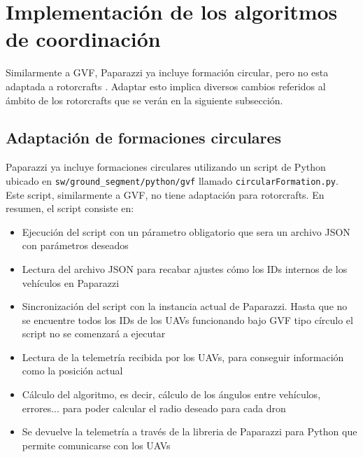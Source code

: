 \section{Implementación de los algoritmos de coordinación}

Similarmente a GVF, Paparazzi ya incluye formación circular, 
pero no esta adaptada a rotorcrafts \cite{paparazzi-circular-formation}.
Adaptar esto implica diversos cambios referidos al ámbito de los rotorcrafts 
que se verán en la siguiente subsección.


\subsection{Adaptación de formaciones circulares}

Paparazzi ya incluye formaciones circulares utilizando un script de Python ubicado en
\texttt{sw/ground\_segment/python/gvf} llamado \texttt{circularFormation.py}.
Este script, similarmente a GVF, no tiene adaptación para rotorcrafts. 
En resumen, el script consiste en:

\begin{itemize}
    \item Ejecución del script con un párametro obligatorio que sera un archivo JSON con parámetros deseados
    \item Lectura del archivo JSON para recabar ajustes cómo los IDs internos de los vehículos en Paparazzi
    \item Sincronización del script con la instancia actual de Paparazzi. Hasta que no se encuentre todos los IDs de los UAVs funcionando bajo GVF tipo círculo el script no se comenzará a ejecutar
    \item Lectura de la telemetría recibida por los UAVs, para conseguir información como la posición actual
    \item Cálculo del algoritmo, es decir, cálculo de los ángulos entre vehículos, errores... para poder calcular el radio deseado para cada dron
    \item Se devuelve la telemetría a través de la libreria de Paparazzi para Python que permite comunicarse con los UAVs
\end{itemize}

